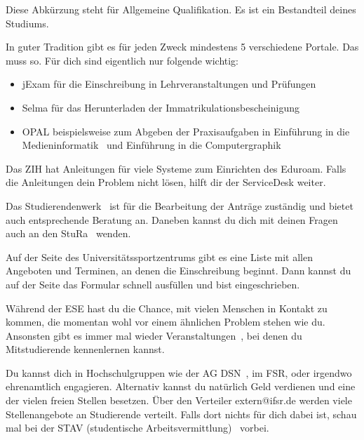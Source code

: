 Diese Abkürzung steht für Allgemeine Qualifikation. Es ist ein Bestandteil deines Studiums.~

In guter Tradition gibt es für jeden Zweck mindestens 5 verschiedene Portale. Das muss so. Für dich sind eigentlich nur folgende wichtig:
\begin{itemize}
\item jExam für die Einschreibung in Lehrveranstaltungen und Prüfungen
\item Selma für das Herunterladen der Immatrikulationsbescheinigung
\item OPAL beispielsweise zum Abgeben der Praxisaufgaben in Einführung in die Medieninformatik~ und Einführung in die Computergraphik~
\end{itemize}

Das ZIH hat Anleitungen für viele Systeme zum Einrichten des Eduroam. Falls die Anleitungen dein Problem nicht lösen, hilft dir der ServiceDesk weiter.

Das Studierendenwerk~ ist für die Bearbeitung der Anträge zuständig und bietet auch entsprechende Beratung an. Daneben kannst du dich mit deinen Fragen auch an den StuRa~ wenden.

Auf der Seite des Universitätssportzentrums gibt es eine Liste mit allen Angeboten und Terminen, an denen die Einschreibung beginnt. Dann kannst du auf der Seite das Formular schnell ausfüllen und bist eingeschrieben.

Während der ESE hast du die Chance, mit vielen Menschen in Kontakt zu kommen, die momentan wohl vor einem ähnlichen Problem stehen wie du.
Ansonsten gibt es immer mal wieder Veranstaltungen~, bei denen du Mitstudierende kennenlernen kannst.

Du kannst dich in Hochschulgruppen wie der AG DSN~, im FSR, oder irgendwo ehrenamtlich engagieren. Alternativ kannst du natürlich Geld verdienen und eine der vielen freien Stellen besetzen. Über den Verteiler extern@ifsr.de werden viele Stellenangebote an Studierende verteilt. Falls dort nichts für dich dabei ist, schau mal bei der STAV (studentische Arbeitsvermittlung)~ vorbei.

